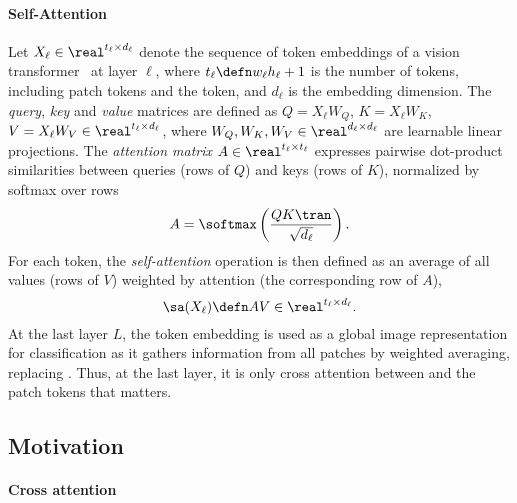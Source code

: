 
\paragraph{Self-Attention}

Let $X_\ell \in \real^{t_\ell \times d_\ell}$ denote the sequence of token embeddings of a vision transformer~\cite{dosovitskiy2020image} at layer $\ell$, where $t_\ell \defn w_\ell h_\ell + 1$ is the number of tokens, including patch tokens and the \cls token, and $d_\ell$ is the embedding dimension. The \emph{query}, \emph{key} and \emph{value} matrices are defined as $Q = X_\ell W_Q$, $K = X_\ell W_K$, $V = X_\ell W_V \in \real^{t_\ell \times d_\ell}$, where $W_Q, W_K, W_V \in \real^{d_\ell \times d_\ell}$ are learnable linear projections. The \emph{attention matrix} $A \in \real^{t_\ell \times t_\ell}$ expresses pairwise dot-product similarities between queries (rows of $Q$) and keys (rows of $K$), normalized by softmax over rows
\begin{equation}
	A = \softmax \left( \frac{Q K\tran}{\sqrt{d_\ell}} \right).
\label{eq:attention}
\end{equation}
For each token, the \emph{self-attention} operation is then defined as an average of all values (rows of $V$) weighted by attention (the corresponding  row of $A$),
\begin{equation}
	\sa(X_\ell) \defn A V \in \real^{t_\ell \times d_\ell}.
\label{eq:SA}
\end{equation}
At the last layer $L$, the \cls token embedding is used as a global image representation for classification as it gathers information from all patches by weighted averaging, replacing \gap. Thus, at the last layer, it is only cross attention between \cls and the patch tokens that matters.


\subsection{Motivation}
\label{subsec:motiv}

\paragraph{Cross attention}

